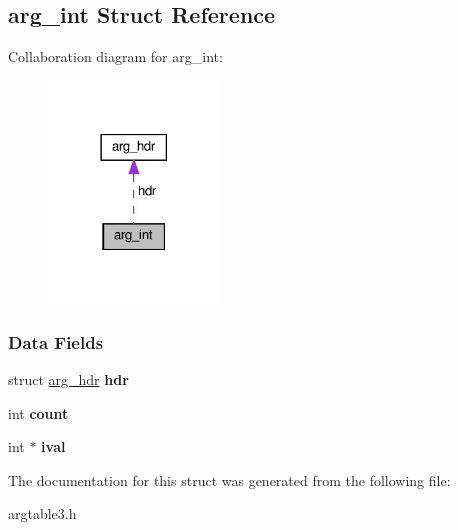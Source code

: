 \hypertarget{structarg__int}{}\subsection{arg\+\_\+int Struct Reference}
\label{structarg__int}


Collaboration diagram for arg\+\_\+int\+:\nopagebreak
\begin{figure}[H]
\begin{center}
\leavevmode
\includegraphics[width=129pt]{structarg__int__coll__graph}
\end{center}
\end{figure}
\subsubsection*{Data Fields}
\begin{DoxyCompactItemize}
\item 
\mbox{\label{structarg__int_a2d761e688517421de2b5c6a7b7a4e164}} 
struct \hyperlink{structarg__hdr}{arg\+\_\+hdr} {\bfseries hdr}
\item 
\mbox{\label{structarg__int_ac27c689313154ed186702d101c8157db}} 
int {\bfseries count}
\item 
\mbox{\label{structarg__int_ae552c7d918197309d6ee227dbfb8ed2e}} 
int $\ast$ {\bfseries ival}
\end{DoxyCompactItemize}


The documentation for this struct was generated from the following file\+:\begin{DoxyCompactItemize}
\item 
argtable3.\+h\end{DoxyCompactItemize}
